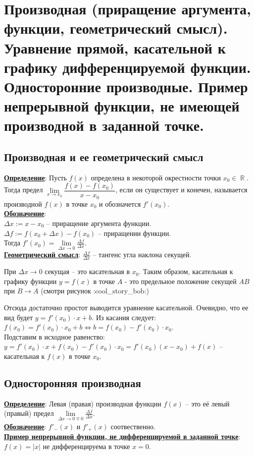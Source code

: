 \documentclass{article}
\DeclareMathOperator{\re}{\mathbb{R}}
\newcommand\abs[1]{\left|#1\right|}
\begin{document}
 
\bigskip\bigskip
\section{Производная (приращение аргумента, функции, геометрический смысл). Уравнение прямой, касательной к графику дифференцируемой функции. Односторонние производные. Пример непрерывной функции, не имеющей производной в заданной точке.}
\subsection*{Производная и ее геометрический смысл}
\textbf{\underline{Определение}}: Пусть $f(x)$ определена в некоторой окрестности точки $x_0\in\re$. Тогда предел $\lim\limits_{x\to x_0} \dfrac{f(x) - f(x_0)}{x - x_0}$, если он существует и конечен, называется производной $f(x)$ в точке $x_0$ и обозначется $f'(x_0)$. \\
\textbf{\underline{Обозначение}}: \\
$\Delta x := x - x_0$ -- приращение аргумента функции. \\
$\Delta f := f(x_0 + \Delta x) - f(x_0)$ -- приращении функции.\\
Тогда $f'(x_0) = \lim\limits_{\Delta x\to 0} \frac{\Delta f}{\Delta x}$. \\
\textbf{\underline{Геометрический смысл}}: $\frac{\Delta f}{\Delta x}$ -- тангенс угла наклона секущей.
\begin{figure}[H]
\end{figure}
   
   
При $\Delta x\to 0$ секущая -- это касательная в $x_0$. Таким образом, касательная к графику функции $y = f(x)$ в точке $A$ - это предельное положение секущей $AB$ при $B\to A$ (смотри рисунок :cool\_story\_bob:)
\begin{figure}[H]
\end{figure}
   
Отсюда достаточно простот выводится уравнение касательной. Очевидно, что ее вид будет $y = f'(x_0)\cdot x + b$. Из касания следует: $f(x_0) = f'(x_0)\cdot x_0 + b \Leftrightarrow b = f(x_0) - f'(x_0)\cdot x_0$.\\
Подставим в исходное равенство: $y = f'(x_0)\cdot x + f(x_0) - f'(x_0)\cdot x_0 = f'(x_0)(x - x_0) + f(x)$ -- касательная к $f(x)$ в точке $x_0$. \\
\subsection*{Односторонняя производная}
\textbf{\underline{Определение}}: Левая (правая) производная функции $f(x)$ -- это её левый (правый) предел $\lim\limits_{\Delta x\to 0\mp 0} \frac{\Delta f}{\Delta x}$. \\
\textbf{\underline{Обозначение}}: $f'_{-}(x)$ и $f'_{+}(x)$ соотвественно.\\
\textbf{\underline{Пример непрерывной функции, не дифференцируемой в заданной точке}}: $f(x) = \abs{x}$ не дифференцируема в точке $x = 0$.
 
\end{document}
